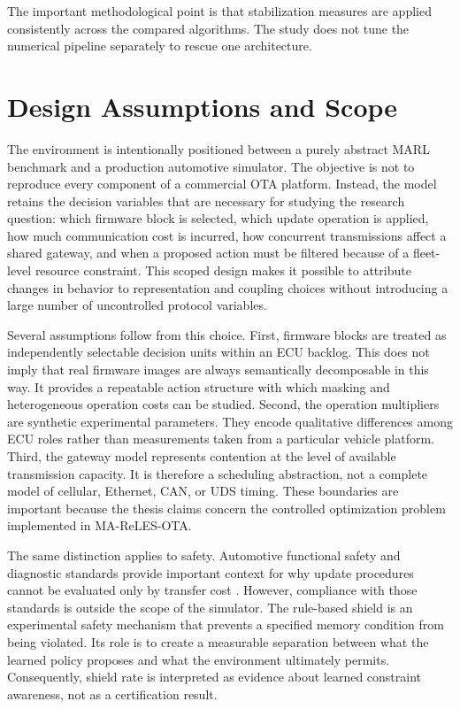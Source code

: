 \documentclass{iutbscthesis}
\begin{document}
The important methodological point is that stabilization measures are applied consistently across the compared algorithms. The study does not tune the numerical pipeline separately to rescue one architecture.


\section{Design Assumptions and Scope}
The environment is intentionally positioned between a purely abstract MARL benchmark and a production automotive simulator. The objective is not to reproduce every component of a commercial OTA platform. Instead, the model retains the decision variables that are necessary for studying the research question: which firmware block is selected, which update operation is applied, how much communication cost is incurred, how concurrent transmissions affect a shared gateway, and when a proposed action must be filtered because of a fleet-level resource constraint. This scoped design makes it possible to attribute changes in behavior to representation and coupling choices without introducing a large number of uncontrolled protocol variables.

Several assumptions follow from this choice. First, firmware blocks are treated as independently selectable decision units within an ECU backlog. This does not imply that real firmware images are always semantically decomposable in this way. It provides a repeatable action structure with which masking and heterogeneous operation costs can be studied. Second, the operation multipliers are synthetic experimental parameters. They encode qualitative differences among ECU roles rather than measurements taken from a particular vehicle platform. Third, the gateway model represents contention at the level of available transmission capacity. It is therefore a scheduling abstraction, not a complete model of cellular, Ethernet, CAN, or UDS timing. These boundaries are important because the thesis claims concern the controlled optimization problem implemented in MA-ReLES-OTA.

The same distinction applies to safety. Automotive functional safety and diagnostic standards provide important context for why update procedures cannot be evaluated only by transfer cost \parencite{iso26262,iso14229}. However, compliance with those standards is outside the scope of the simulator. The rule-based shield is an experimental safety mechanism that prevents a specified memory condition from being violated. Its role is to create a measurable separation between what the learned policy proposes and what the environment ultimately permits. Consequently, shield rate is interpreted as evidence about learned constraint awareness, not as a certification result.
\end{document}
